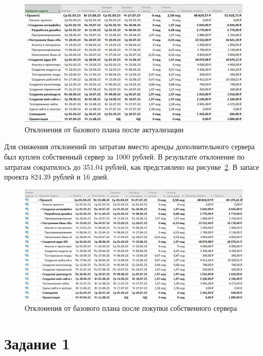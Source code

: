 \begin{figure}[H]
	\begin{center}
		\includegraphics[scale=0.3]{inc/img/deviation1.jpg}
	\end{center}
	\captionsetup{justification=centering}
	\caption{Отклонения от базового плана после актуализации}
	\label{img:deviation1}
\end{figure}

Для снижения отклонений по затратам вместо аренды дополнительного сервера был куплен собственный сервер за 1000 рублей. В результате отклонение по затратам сократилось до 351.04 рублей, как представлено на рисунке~\ref{img:deviation2}. В запасе проекта 824.39 рублей и 16 дней. 

\begin{figure}[H]
	\begin{center}
		\includegraphics[scale=0.3]{inc/img/deviation2.jpg}
	\end{center}
	\captionsetup{justification=centering}
	\caption{Отклонения от базового плана после покупки собственного сервера}
	\label{img:deviation2}
\end{figure}

\section*{Задание 1}

